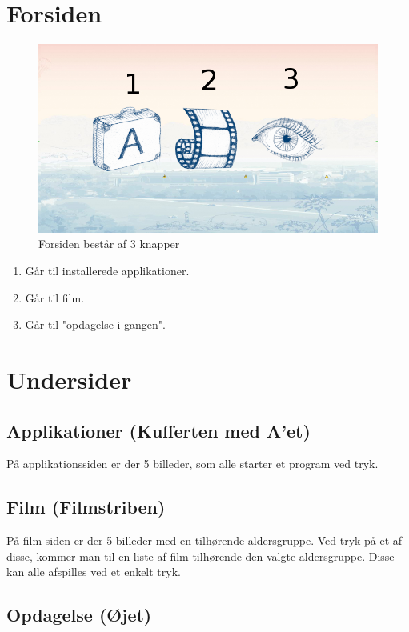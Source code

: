 \documentclass[12pt]{article}
\begin{document}
\section{Forsiden}
\begin{figure}[H]
  \centering
  \includegraphics[width=1.0\textwidth]{forside.png}
  \caption{Forsiden består af 3 knapper}
  \label{fig:forside}
\end{figure}

\begin{enumerate}
    \item Går til installerede applikationer.
    \item Går til film.
    \item Går til "opdagelse i gangen".
\end{enumerate}

\newpage

\section{Undersider}
\subsection{Applikationer (Kufferten med A'et)}
På applikationssiden er der 5 billeder, som alle starter et program ved tryk.

\subsection{Film (Filmstriben)}
På film siden er der 5 billeder med en tilhørende aldersgruppe. Ved tryk på et
af disse, kommer man til en liste af film tilhørende den valgte aldersgruppe.
Disse kan alle afspilles ved et enkelt tryk.

\subsection{Opdagelse (Øjet)} 
\end{document}
